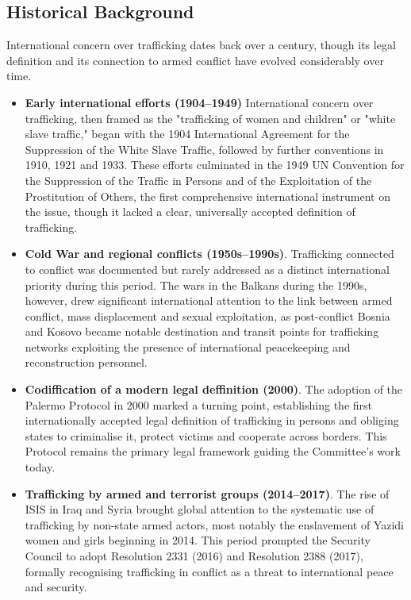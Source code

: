 \subsection{Historical Background}

International concern over trafficking dates back over a century, though its legal definition and its connection to armed conflict have evolved considerably over time.

\begin{itemize}
  \item \textbf{Early international efforts (1904–1949)} International concern over trafficking, then framed as the "trafficking of women and children" or "white slave traffic," began with the 1904 International Agreement for the Suppression of the White Slave Traffic, followed by further conventions in 1910, 1921 and 1933. These efforts culminated in the 1949 UN Convention for the Suppression of the Traffic in Persons and of the Exploitation of the Prostitution of Others, the first comprehensive international instrument on the issue, though it lacked a clear, universally accepted definition of trafficking.
  \item \textbf{Cold War and regional conflicts (1950s–1990s)}. Trafficking connected to conflict was documented but rarely addressed as a distinct international priority during this period. The wars in the Balkans during the 1990s, however, drew significant international attention to the link between armed conflict, mass displacement and sexual exploitation, as post-conflict Bosnia and Kosovo became notable destination and transit points for trafficking networks exploiting the presence of international peacekeeping and reconstruction personnel.
  \item \textbf{Codiffication of a modern legal deffinition (2000)}. The adoption of the Palermo Protocol in 2000 marked a turning point, establishing the first internationally accepted legal definition of trafficking in persons and obliging states to criminalise it, protect victims and cooperate across borders. This Protocol remains the primary legal framework guiding the Committee's work today.
  \item \textbf{Trafficking by armed and terrorist groups (2014–2017)}. The rise of ISIS in Iraq and Syria brought global attention to the systematic use of trafficking by non-state armed actors, most notably the enslavement of Yazidi women and girls beginning in 2014. This period prompted the Security Council to adopt Resolution 2331 (2016) and Resolution 2388 (2017), formally recognising trafficking in conflict as a threat to international peace and security.
\end{itemize}

